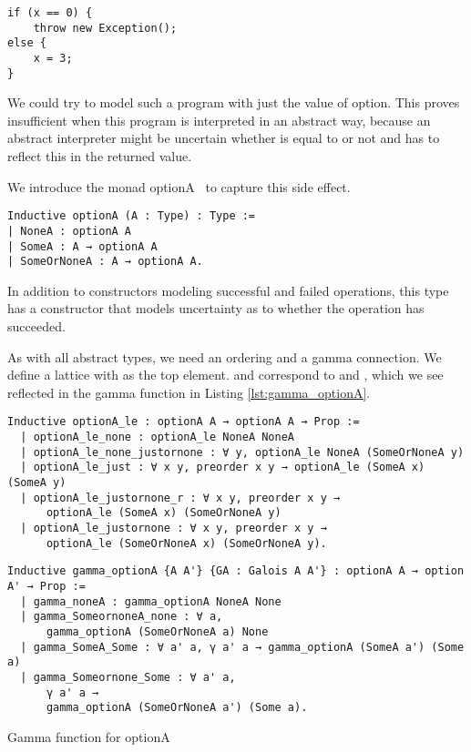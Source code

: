{\begin{verbatim}
if (x == 0) {
    throw new Exception();
else {
    x = 3;
}
\end{verbatim}

We could try to model such a program with just the  value of option. 
This proves insufficient when this program is interpreted in an abstract way, 
because an abstract interpreter might be uncertain whether  is equal to 
 or not and has to reflect this in the returned value.

We introduce the monad optionA~\cite{keidel2018compositional} 
to capture this side effect.

\begin{verbatim}
Inductive optionA (A : Type) : Type :=
| NoneA : optionA A
| SomeA : A → optionA A
| SomeOrNoneA : A → optionA A.
\end{verbatim}

In addition to constructors modeling successful and failed operations, this
type has a constructor that models uncertainty as to whether the operation has
succeeded.

As with all abstract types, we need an ordering and a gamma connection. We
define a lattice with  as the top element.  and
 correspond to  and , which we see reflected
in the gamma function in Listing \ref{lst:gamma_optionA}.

\begin{verbatim}
Inductive optionA_le : optionA A → optionA A → Prop :=
  | optionA_le_none : optionA_le NoneA NoneA
  | optionA_le_none_justornone : ∀ y, optionA_le NoneA (SomeOrNoneA y)
  | optionA_le_just : ∀ x y, preorder x y → optionA_le (SomeA x) (SomeA y)
  | optionA_le_justornone_r : ∀ x y, preorder x y →
      optionA_le (SomeA x) (SomeOrNoneA y)
  | optionA_le_justornone : ∀ x y, preorder x y → 
      optionA_le (SomeOrNoneA x) (SomeOrNoneA y).
\end{verbatim}

\begin{listing}
\begin{verbatim}
Inductive gamma_optionA {A A'} {GA : Galois A A'} : optionA A → option A' → Prop :=
  | gamma_noneA : gamma_optionA NoneA None
  | gamma_SomeornoneA_none : ∀ a, 
      gamma_optionA (SomeOrNoneA a) None
  | gamma_SomeA_Some : ∀ a' a, γ a' a → gamma_optionA (SomeA a') (Some a)
  | gamma_Someornone_Some : ∀ a' a, 
      γ a' a →
      gamma_optionA (SomeOrNoneA a') (Some a).
\end{verbatim}
\caption{Gamma function for optionA}
\label{lst:gamma_optionA}
\end{listing}

}
